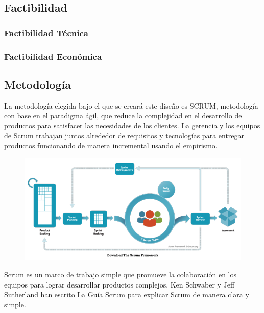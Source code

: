 \documentclass[10pt]{article}
\begin{document}
\subsection{Factibilidad}
\subsubsection{Factibilidad Técnica}
\subsubsection{Factibilidad Económica}

\subsection{Metodología}
La metodología elegida bajo el que se creará este diseño es SCRUM, metodología con base en el paradigma ágil, que reduce la complejidad en el desarrollo de productos para satisfacer las necesidades de los clientes. La gerencia y los equipos de Scrum trabajan juntos alrededor de requisitos y tecnologías para entregar productos funcionando de manera incremental usando el empirismo. 

\begin{figure}[H]
	\begin{center}
\includegraphics[scale = 0.80]{Imagenes/ScrumFramework.png}
	\end{center} 
\end{figure}

Scrum es un marco de trabajo simple que promueve la colaboración en los equipos para lograr desarrollar productos complejos. Ken Schwaber y Jeff Sutherland han escrito La Guía Scrum para explicar Scrum de manera clara y simple. \newline

\setlength{\parskip}{2mm}
\end{document}
